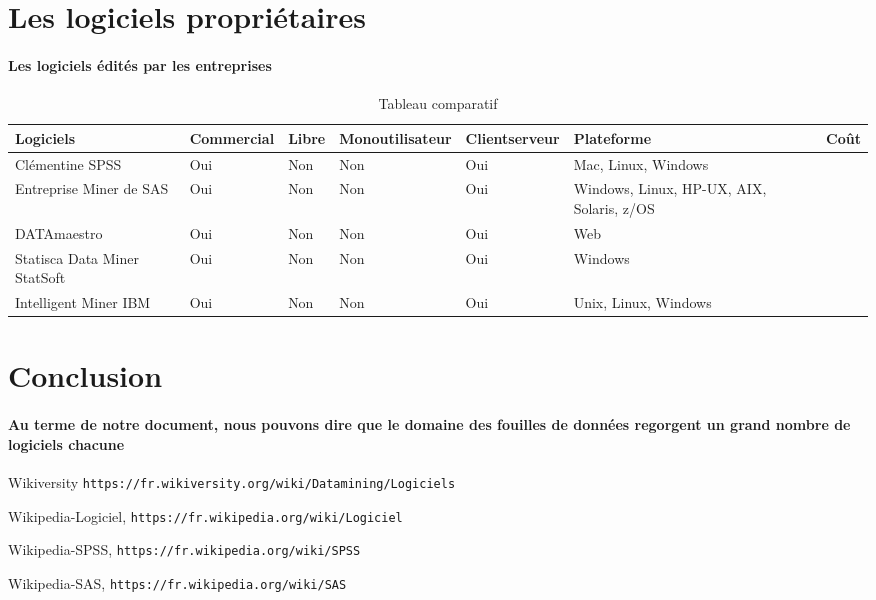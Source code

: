 \documentclass[12pt]{article}
\begin{document}
	\section{Les logiciels propriétaires}
		\paragraph{Les logiciels édités par les entreprises}
	\begin{table}[h]
		\caption{\label{tab:table-name}Tableau comparatif}
		\begin{center}	
			\begin{adjustbox}{max width=\textwidth}
				\begin{tabular}{| l | l | l | l | l | l | }		
					\hline
					Logiciels & Commercial & Libre & Monoutilisateur & Clientserveur & Plateforme & Coût\\ \hline
				Clémentine SPSS & Oui & Non & Non & Oui & Mac, Linux, Windows \\ \hline
				Entreprise Miner de SAS & Oui & Non & Non & Oui & Windows, Linux, HP-UX, AIX, Solaris, z/OS \\ \hline
				DATAmaestro & Oui & Non & Non & Oui & Web\\ \hline
				Statisca Data Miner StatSoft & Oui & Non & Non & Oui & Windows \\ \hline 
				Intelligent Miner IBM & Oui & Non & Non & Oui & Unix, Linux, Windows \\ \hline
				
				
				\end{tabular}
			\end{adjustbox}
		\end{center}
	\end{table}

\section*{Conclusion}
	\paragraph{Au terme de notre document, nous pouvons dire que le domaine des fouilles de données regorgent un grand nombre de logiciels chacune }
\newpage
\begin{thebibliography}{9}
	Wikiversity
	\texttt{https://fr.wikiversity.org/wiki/Datamining/Logiciels}
	
	Wikipedia-Logiciel,
	\texttt{https://fr.wikipedia.org/wiki/Logiciel}
	
	Wikipedia-SPSS,
	\texttt{https://fr.wikipedia.org/wiki/SPSS}

	Wikipedia-SAS,	
	\texttt{https://fr.wikipedia.org/wiki/SAS}	
	
\end{thebibliography}
\end{document}
